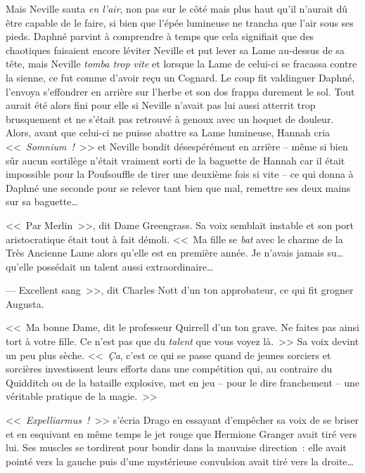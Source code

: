 Mais Neville sauta \emph{en l'air}, non pas sur le côté mais plus haut qu'il n'aurait dû être capable de le faire, si bien que l'épée lumineuse ne trancha que l'air sous ses pieds. Daphné parvint à comprendre à temps que cela signifiait que des chaotiques faisaient encore léviter Neville et put lever sa Lame au-dessus de sa tête, mais Neville \emph{tomba trop vite} et lorsque la Lame de celui-ci se fracassa contre la sienne, ce fut comme d'avoir reçu un Cognard. Le coup fit valdinguer Daphné, l'envoya s'effondrer en arrière sur l'herbe et son dos frappa durement le sol. Tout aurait été alors fini pour elle si Neville n'avait pas lui aussi atterrit trop brusquement et ne s'était pas retrouvé à genoux avec un hoquet de douleur. Alors, avant que celui-ci ne puisse abattre sa Lame lumineuse, Hannah cria <<~\emph{Somnium~!}~>> et Neville bondit désespérément en arrière -- même si bien sûr aucun sortilège n'était vraiment sorti de la baguette de Hannah car il était impossible pour la Poufsouffle de tirer une deuxième fois si vite -- ce qui donna à Daphné une seconde pour se relever tant bien que mal, remettre ses deux mains sur sa baguette…

\later

<<~Par Merlin~>>, dit Dame Greengrass. Sa voix semblait instable et son port aristocratique était tout à fait démoli. <<~Ma fille se \emph{bat} avec le charme de la Très Ancienne Lame alors qu'elle est en première année. Je n'avais jamais su… qu'elle possédait un talent aussi extraordinaire…

--- Excellent sang~>>, dit Charles Nott d'un ton approbateur, ce qui fit grogner Augusta.

<<~Ma bonne Dame, dit le professeur Quirrell d'un ton grave. Ne faites pas ainsi tort à votre fille. Ce n'est pas que du \emph{talent} que vous voyez là.~>> Sa voix devint un peu plus sèche. <<~\emph{Ça}, c'est ce qui se passe quand de jeunes sorciers et sorcières investissent leurs efforts dans une compétition qui, au contraire du Quidditch ou de la bataille explosive, met en jeu -- pour le dire franchement -- une véritable pratique de la magie.~>>

\later

<<~\emph{Expelliarmus~!}~>> s'écria Drago en essayant d'empêcher sa voix de se briser et en esquivant en même temps le jet rouge que Hermione Granger avait tiré vers lui. Ses muscles se tordirent pour bondir dans la mauvaise direction~: elle avait pointé vers la gauche puis d'une mystérieuse convulsion avait tiré vers la droite…

